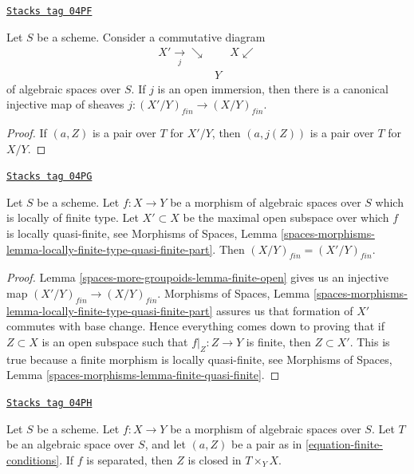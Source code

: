 \begin{lemma}
\label{spaces-more-groupoids-lemma-finite-open}
\href{https://stacks.math.columbia.edu/tag/04PF}{\texttt{Stacks tag 04PF}}

Let $S$ be a scheme. Consider a commutative diagram
$$
\begin{array}{ccc}X' \underset{j}{\longrightarrow}\searrow &  & X \swarrow \\  & Y & \end{array}
$$
of algebraic spaces over $S$. If $j$ is an open immersion, then
there is a canonical injective map of sheaves
$j : (X'/Y)_{fin} \to (X/Y)_{fin}$.
\end{lemma}

\begin{proof}
If $(a, Z)$ is a pair over $T$ for $X'/Y$, then
$(a, j(Z))$ is a pair over $T$ for $X/Y$.
\end{proof}

\begin{lemma}
\label{spaces-more-groupoids-lemma-finite-lives-on-locally-quasi-finite-part}
\href{https://stacks.math.columbia.edu/tag/04PG}{\texttt{Stacks tag 04PG}}

Let $S$ be a scheme.
Let $f : X \to Y$ be a morphism of algebraic spaces over $S$ which is
locally of finite type.
Let $X' \subset X$ be the maximal open subspace over which $f$ is
locally quasi-finite, see
Morphisms of Spaces,
Lemma \ref{spaces-morphisms-lemma-locally-finite-type-quasi-finite-part}.
Then $(X/Y)_{fin} = (X'/Y)_{fin}$.
\end{lemma}

\begin{proof}
Lemma \ref{spaces-more-groupoids-lemma-finite-open}
gives us an injective map $(X'/Y)_{fin} \to (X/Y)_{fin}$.
Morphisms of Spaces,
Lemma \ref{spaces-morphisms-lemma-locally-finite-type-quasi-finite-part}
assures us that formation of $X'$ commutes with base change.
Hence everything comes down to proving that if
$Z \subset X$ is an open subspace such that $f|_Z : Z \to Y$ is finite,
then $Z \subset X'$. This is true because a finite morphism
is locally quasi-finite, see
Morphisms of Spaces, Lemma \ref{spaces-morphisms-lemma-finite-quasi-finite}.
\end{proof}

\begin{lemma}
\label{spaces-more-groupoids-lemma-finite-separated}
\href{https://stacks.math.columbia.edu/tag/04PH}{\texttt{Stacks tag 04PH}}

Let $S$ be a scheme.
Let $f : X \to Y$ be a morphism of algebraic spaces over $S$.
Let $T$ be an algebraic space over $S$, and let $(a, Z)$ be
a pair as in \ref{equation-finite-conditions}.
If $f$ is separated, then $Z$ is closed in $T \times_Y X$.
\end{lemma}

